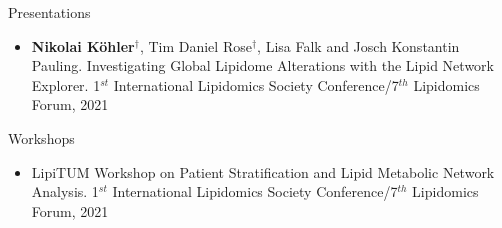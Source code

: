 
\datedsubsection{}
{%
}
{%
	Presentations
}
{%
	\begin{itemize}
		\item \textbf{Nikolai K\"ohler}$^{\dagger}$, Tim Daniel Rose$^{\dagger}$, Lisa Falk and Josch Konstantin Pauling. Investigating Global Lipidome Alterations with the Lipid Network Explorer. 1$^{st}$ International Lipidomics Society Conference/7$^{th}$ Lipidomics Forum, 2021
	\end{itemize}
}

\datedsubsection{}
{%
}
{%
	Workshops
}
{%
	\begin{itemize}
		\item LipiTUM Workshop on Patient Stratification and Lipid Metabolic Network Analysis. 1$^{st}$ International Lipidomics Society Conference/7$^{th}$ Lipidomics Forum, 2021
	\end{itemize}
}
